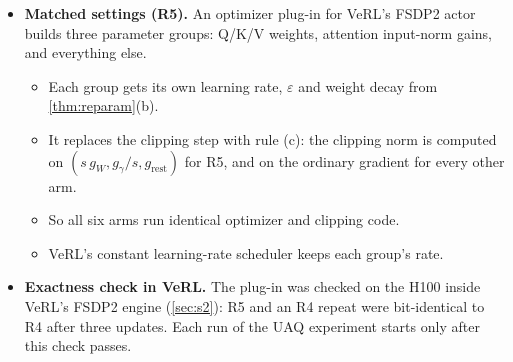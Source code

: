 \begin{itemize}[leftmargin=*,itemsep=2pt]
\item \textbf{Matched settings (R5).} An optimizer plug-in for VeRL's FSDP2 actor builds three parameter groups: Q/K/V weights, attention input-norm gains, and everything else.
  \begin{itemize}[leftmargin=*,itemsep=1pt]
  \item Each group gets its own learning rate, $\varepsilon$ and weight decay from \cref{thm:reparam}(b).
  \item It replaces the clipping step with rule (c): the clipping norm is computed on $(s\,g_W,g_\gamma/s,g_{\mathrm{rest}})$ for R5, and on the ordinary gradient for every other arm.
  \item So all six arms run identical optimizer and clipping code.
  \item VeRL's constant learning-rate scheduler keeps each group's rate.
  \end{itemize}
\item \textbf{Exactness check in VeRL.} The plug-in was checked on the H100 inside VeRL's FSDP2 engine (\cref{sec:s2}): R5 and an R4 repeat were bit-identical to R4 after three updates. Each run of the UAQ experiment starts only after this check passes.
\end{itemize}

